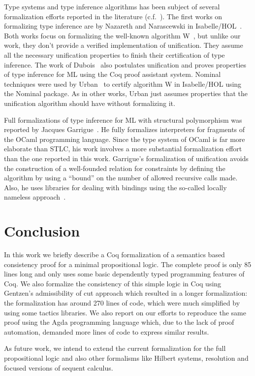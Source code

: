 Type systems and type inference algorithms has been subject of several formalization efforts
reported in the literature (c.f.~\cite{DuboisM99,NaraschewskiN-JAR,Nazareth-Nipkow,UrbanN2009,Garrigue10,Garrigue15}).
The first works on formalizing type inference are by Nazareth and
Narascewski in Isabelle/HOL~\cite{NaraschewskiN-JAR,Nazareth-Nipkow}.
Both works focus on formalizing the well-known algorithm
W~\cite{Milner1978}, but unlike our work, they don't provide a verified
implementation of unification. They assume all the necessary
unification properties to finish their certification of type
inference. The work of Dubois~\cite{DuboisM99} also postulates
unification and proves properties of type inference for ML using the
Coq proof assistant system.  Nominal techniques were used by
Urban~\cite{UrbanN2009} to certify algorithm W in Isabelle/HOL using
the Nominal package. As in other works, Urban just assumes properties
that the unification algorithm should have without formalizing it.


Full formalizations of type inference for ML with structural
polymorphism was reported by Jacques
Garrigue~\cite{Garrigue10,Garrigue15}. He fully formalizes
interpreters for fragments of the OCaml programming language. Since
the type system of OCaml is far more elaborate than STLC, his work
involves a more substantial formalization effort than the one reported
in this work. Garrigue's formalization of unification avoids the
construction of a well-founded relation for constraints by defining
the algorithm by using a ``bound'' on the number of allowed recursive
calls made.  Also, he uses libraries for dealing with bindings using
the so-called locally nameless approach~\cite{Chargueraud12}.


\section{Conclusion}\label{sec:conclusion}


In this work we briefly describe a Coq formalization of a semantics based consistency proof for
a minimal propositional logic. The complete proof is only 85 lines long and only uses some basic
dependently typed programming features of Coq. We also
formalize the consistency of this simple logic in Coq using Gentzen's admissibility of cut approach
which resulted in a longer formalization: the formalization has around 270 lines of code, which were much
simplified by using some tactics libraries. We also report on our efforts to reproduce the same proof
using the Agda programming language which, due to the lack of proof automation, demanded more lines of code
to express similar results.


As future work, we intend to extend the current formalization for the full propositional logic and also
other formalisms like Hilbert systems, resolution and focused versions of sequent calculus.
 \begin{coqdoccode}
\end{coqdoccode}

